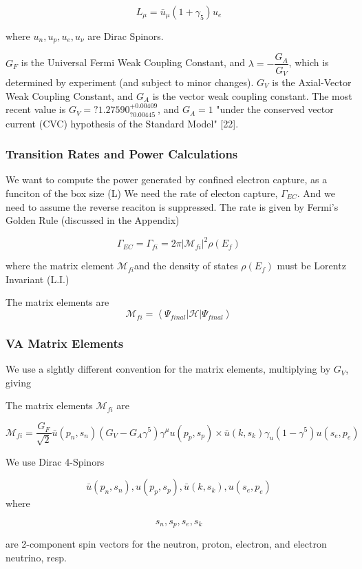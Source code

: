 \documentclass[11pt]{amsart}
\begin{document}
$$L_{\mu}=\bar{u}_{\mu}(1+\gamma_{5})u_{e}$$

where $u_{n},u_{p},u_{e},u_{\nu}$ are Dirac Spinors.

$G_{F}$ is the Universal Fermi Weak Coupling Constant, and $\lambda=-\dfrac{G_{A}}{G_{V}}$, which is determined by experiment (and subject to minor changes).  $G_{V}$ is the Axial-Vector Weak Coupling Constant, and $G_{A}$ is the vector weak coupling
constant.  The most recent value is $G_{V}=?1.27590^{+0.00409}_{?0.00445}$, and $G_{A}=1$ "under the conserved vector current (CVC) hypothesis of the Standard Model" [22].
 
\subsubsection{Transition Rates and Power Calculations}

We want to compute the power generated by confined electron capture, as a funciton of the box size (L)
We need the  rate of electon capture, $\Gamma_{EC}$.  And we need to assume the reverse reaciton is suppressed.  The rate is given by Fermi's Golden Rule (discussed in the Appendix)

$$\Gamma_{EC}=\Gamma_{fi}=2\pi|\mathcal{M}_{fi}|^{2}\rho(E_{f})$$

where the matrix element $\mathcal{M}_{fi}$and the density of states $\rho(E_{f})$ must be Lorentz Invariant (L.I.)

The matrix elements are 
$$\mathcal{M}_{fi}=\left<\Psi_{final}\big\vert\mathcal{H}\big\vert\Psi_{final}\right>$$


\subsubsection{VA Matrix Elements}

We use a slghtly different convention for the matrix elements, multiplying by $G_{V}$, giving

The matrix elements $\mathcal{M}_{fi}$ are

$$\mathcal{M}_{fi}=\dfrac{G_{F}}{\sqrt{2}}\bar{u}(p_{n},s_{n})(G_{V}-G_{A}\gamma^{5})\gamma^{\mu}u(p_{p},s_{p})\times\bar{u}(k,s_{k})\gamma_{u}(1-\gamma^{5})u(s_{e},p_{e})$$


We use Dirac 4-Spinors

$$\bar{u}(p_{n},s_{n}),u(p_{p},s_{p}),\bar{u}(k,s_{k}),u(s_{e},p_{e})$$
where

$$s_{n}, s_{p},s_{e},s_{k}$$ 

are 2-component spin vectors for the neutron, proton, electron, and electron neutrino, resp. 
\end{document}
